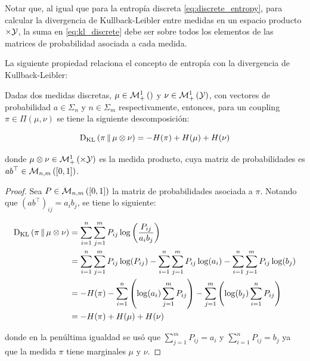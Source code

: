 Notar que, al igual que para la entropía discreta \eqref{eq:discrete_entropy}, para calcular la divergencia de Kullback-Leibler entre medidas en un espacio producto $\times\mathcal{Y}$, la suma en \eqref{eq:kl_discrete} debe ser sobre todos los elementos de las matrices de probabilidad asociada a cada medida.

La siguiente propiedad relaciona el concepto de entropía con la divergencia de Kullback-Leibler:

\begin{prop}
	Dadas dos medidas discretas, $\mu\in\mathcal{M}_+^1\left(\right)$ y $\nu\in\mathcal{M}_+^1\left(\mathcal{Y}\right)$, con vectores de probabilidad $a\in\Sigma_n$ y $n\in\Sigma_m$ respectivamente, entonces, para un coupling $\pi\in\Pi(\mu,\nu)$ se tiene la siguiente descomposición:

	\begin{equation*}
		\operatorname{D_{KL}}\left(\pi\,\|\,\mu\otimes\nu\right) = -H(\pi) + H(\mu) + H(\nu)
	\end{equation*}

	donde $\mu\otimes\nu\in\probmeasure{\xspace\times\yspace}$ es la medida producto, cuya matriz de probabilidades es $ab^\top\in\mathcal{M}_{n,m}\left([0,1]\right)$.
\end{prop}

\begin{proof}
	Sea $P\in\mathcal{M}_{n,m}\left([0,1]\right)$ la matriz de probabilidades asociada a $\pi$. Notando que $(ab^\top)_{ij} = a_i b_j$, se tiene lo siguiente:

	\begin{align*}
		\operatorname{D_{KL}}\left(\pi\,\|\,\mu\otimes\nu\right) & = \sum_{i=1}^n \sum_{j=1}^m P_{ij}\log\left(\frac{P_{ij}}{a_ib_j}\right)                                                                    \\
		                        & = \sum_{i=1}^n \sum_{j=1}^m P_{ij}\log(P_{ij}) - \sum_{i=1}^n \sum_{j=1}^m P_{ij}\log(a_i) - \sum_{i=1}^n \sum_{j=1}^m P_{ij} \log(b_j) \\
		                        & = -H(\pi) - \sum_{i=1}^n \left(\log(a_i)\sum_{j=1}^m P_{ij}\right) - \sum_{j=1}^m \left(\log(b_j) \sum_{i=1}^n P_{ij}\right)                    \\
		                        & = -H(\pi) + H(\mu) + H(\nu)
	\end{align*}

	donde en la penúltima igualdad se usó que $\sum_{j=1}^m P_{ij} = a_i$ y $\sum_{i=1}^n P_{ij} = b_j$ ya que la medida $\pi$ tiene marginales $\mu$ y $\nu$.
\end{proof}

